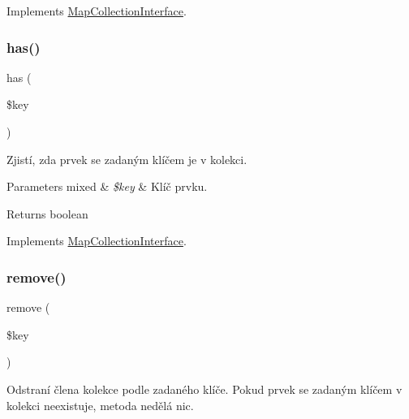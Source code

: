 Implements \mbox{\hyperlink{interface_pes_1_1_collection_1_1_map_collection_interface}{Map\+Collection\+Interface}}.

\mbox{\label{class_pes_1_1_collection_1_1_map_collection_a8b23dbb48f0c3c94725695191d06981a}} 
\subsubsection{\texorpdfstring{has()}{has()}}
{\footnotesize\ttfamily has (\begin{DoxyParamCaption}\item[{}]{\$key }\end{DoxyParamCaption})}

Zjistí, zda prvek se zadaným klíčem je v kolekci. 
\begin{DoxyParams}[1]{Parameters}
mixed & {\em \$key} & Klíč prvku. \\
\hline
\end{DoxyParams}
\begin{DoxyReturn}{Returns}
boolean 
\end{DoxyReturn}


Implements \mbox{\hyperlink{interface_pes_1_1_collection_1_1_map_collection_interface}{Map\+Collection\+Interface}}.

\mbox{\label{class_pes_1_1_collection_1_1_map_collection_a95483af4e2c07dc9893fe058b026bd5d}} 
\subsubsection{\texorpdfstring{remove()}{remove()}}
{\footnotesize\ttfamily remove (\begin{DoxyParamCaption}\item[{}]{\$key }\end{DoxyParamCaption})}

Odstraní člena kolekce podle zadaného klíče. Pokud prvek se zadaným klíčem v kolekci neexistuje, metoda nedělá nic.



